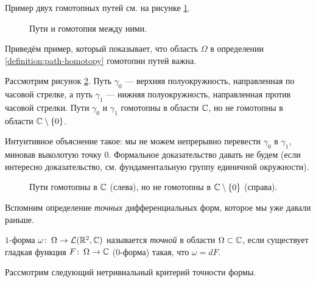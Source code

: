 \documentclass[../complex-analysis.tex]{subfiles}
\begin{document}
Пример двух гомотопных путей см. на рисунке \ref{fig:path-homptopy}.

\begin{figure}[ht]
 \centering
 \caption{Пути и гомотопия между ними.}
 \label{fig:path-homptopy}
\end{figure}

Приведём пример, который показывает, что область $\Omega$ в определении \ref{definition:path-homotopy} гомотопии путей важна.

\begin{exmpl}
 Рассмотрим рисунок \ref{fig:paths-without-homptopy}. Путь $\gamma_0$ --- верхняя полуокружность, направленная по часовой стрелке, а путь $\gamma_1$ ---  нижняя полуокружность, направленная против часовой стрелки. Пути $\gamma_0$ и $\gamma_1$ гомотопны в области $\mathbb{C}$, но не гомотопны в области $\mathbb{C} \setminus \left\{ 0 \right\}$.

 Интуитивное объяснение такое: мы не можем непрерывно перевести $\gamma_0$ в $\gamma_1$, миновав выколотую точку $0$. Формальное доказательство давать не будем (если интересно доказательство, см. фундаментальную группу единичной окружности).
\end{exmpl}

\begin{figure}[ht]
 \centering
 \caption{Пути гомотопны в $\mathbb{C}$ (слева), но не гомотопны в $\mathbb{C} \setminus \left\{ 0 \right\}$ (справа).}
 \label{fig:paths-without-homptopy}
\end{figure}

Вспомним определение \textit{точных} дифференциальных форм, которое мы уже давали раньше.

\begin{df}
 $1$-форма $\omega \colon\, \Omega \to \mathcal{L}(\mathbb{R}^2, \mathbb{C})$ называется \textit{точной} в области $\Omega \subset \mathbb{C}$, если существует гладкая функция $F \colon\, \Omega \to \mathbb{C}$ ($0$-форма) такая, что $\omega = dF$.
\end{df}

Рассмотрим следующий нетривиальный критерий точности формы.
\end{document}

